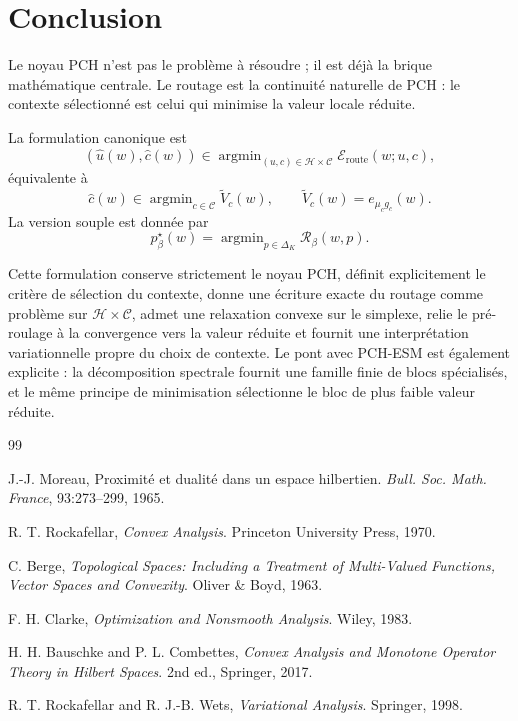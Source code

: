 \documentclass[11pt,a4paper]{article}
\DeclareMathOperator{\argmin}{argmin}
\newcommand{\Hh}{\mathcal H}
\newcommand{\Ccal}{\mathcal C}
\newcommand{\Rcal}{\mathcal R}
\begin{document}
\section{Conclusion}

Le noyau PCH n'est pas le problème à résoudre ; il est déjà la brique mathématique centrale. Le routage est la continuité naturelle de PCH : le contexte sélectionné est celui qui minimise la valeur locale réduite.

La formulation canonique est
\[
(\hat u(w),\hat c(w))\in\argmin_{(u,c)\in\Hh\times\Ccal}\mathcal E_{\mathrm{route}}(w;u,c),
\]
équivalente à
\[
\hat c(w)\in\argmin_{c\in\Ccal}\widetilde V_c(w),
\qquad
\widetilde V_c(w)=e_{\mu_c g_c}(w).
\]
La version souple est donnée par
\[
p^\star_\beta(w)=\argmin_{p\in\Delta_K}\Rcal_\beta(w,p).
\]

Cette formulation conserve strictement le noyau PCH, définit explicitement le critère de sélection du contexte, donne une écriture exacte du routage comme problème sur \(\Hh\times\Ccal\), admet une relaxation convexe sur le simplexe, relie le pré-roulage à la convergence vers la valeur réduite et fournit une interprétation variationnelle propre du choix de contexte. Le pont avec PCH-ESM est également explicite : la décomposition spectrale fournit une famille finie de blocs spécialisés, et le même principe de minimisation sélectionne le bloc de plus faible valeur réduite.

\begin{thebibliography}{99}

J.-J. Moreau,
\newblock Proximité et dualité dans un espace hilbertien.
\newblock \emph{Bull. Soc. Math. France}, 93:273--299, 1965.

R. T. Rockafellar,
\newblock \emph{Convex Analysis}.
\newblock Princeton University Press, 1970.

C. Berge,
\newblock \emph{Topological Spaces: Including a Treatment of Multi-Valued Functions, Vector Spaces and Convexity}.
\newblock Oliver \& Boyd, 1963.

F. H. Clarke,
\newblock \emph{Optimization and Nonsmooth Analysis}.
\newblock Wiley, 1983.

H. H. Bauschke and P. L. Combettes,
\newblock \emph{Convex Analysis and Monotone Operator Theory in Hilbert Spaces}.
\newblock 2nd ed., Springer, 2017.

R. T. Rockafellar and R. J.-B. Wets,
\newblock \emph{Variational Analysis}.
\newblock Springer, 1998.

\end{thebibliography}
\end{document}
